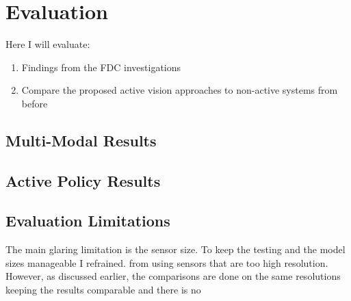 \chapter{Evaluation}\label{ch:eval}
Here I will evaluate:
\begin{enumerate}
  \item Findings from the FDC investigations
  \item Compare the proposed active vision approaches to non-active systems from before
\end{enumerate}





\section{Multi-Modal Results}

  

  
  
  

  

  
  
  

  


\section{Active Policy Results}\todo[color=red]{}


\section{Evaluation Limitations}\todo[color=red]{}
The main glaring limitation is the sensor size. To keep the testing and the model sizes manageable I refrained. from using sensors that are too high resolution. However, as discussed earlier, the comparisons are done on the same resolutions keeping the results comparable and there is no 



